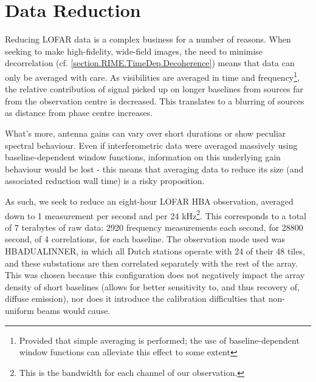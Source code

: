 \section{Data Reduction}



\pg
Reducing LOFAR data is a complex business for a number of reasons. When seeking to make high-fidelity, wide-field images, the need to minimise decorrelation (cf. \cref{section.RIME.TimeDep.Decoherence}) means that data can only be averaged with care. As visibilities are averaged in time and frequency\footnote{Provided that simple averaging is performed; the use of baseline-dependent window functions can alleviate this effect to some extent}, the relative contribution of signal picked up on longer baselines from sources far from the observation centre is decreased. This translates to a blurring of sources as distance from phase centre increases.

\pg
What's more, antenna gains can vary over short durations or show peculiar spectral behaviour. Even if interferometric data were averaged massively using baseline-dependent window functions, information on this underlying gain behaviour would be lost - this means that averaging data to reduce its size (and associated reduction wall time) is a risky proposition.

\pg
As such, we seek to reduce an eight-hour LOFAR HBA observation, averaged down to 1 measurement per second and per 24 kHz\footnote{This is the bandwidth for each channel of our observation.}. This corresponds to a total of 7 terabytes of raw data: 2920 frequency measurements each second, for 28800 second, of 4 correlations, for each baseline. The observation mode used was HBA\textunderscore DUAL\textunderscore INNER, in which all Dutch stations operate with 24 of their 48 tiles, and these substations are then correlated separately with the rest of the array. This was chosen because this configuration does not negatively impact the array density of short baselines (allows for better sensitivity to, and thus recovery of, diffuse emission), nor does it introduce the calibration difficulties that non-uniform beams would cause.

